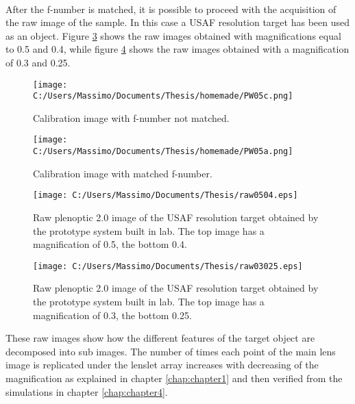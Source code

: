\\
After the f-number is matched, it is possible to proceed with the acquisition of the raw image of the sample. In this case a USAF resolution target has been used as an object. Figure \ref{fig:rawreal} shows the raw images obtained with magnifications equal to 0.5 and 0.4, while figure \ref{fig:rawreal2} shows the raw images obtained with a magnification of 0.3 and 0.25.
\begin{figure}[H]
	\centering
	\texttt{[image: C:/Users/Massimo/Documents/Thesis/homemade/PW05c.png]}
	\caption{\label{fig:calibrationimg1} Calibration image with f-number not matched. }
\end{figure}
\begin{figure}[H]
	\centering
	\texttt{[image: C:/Users/Massimo/Documents/Thesis/homemade/PW05a.png]}
	\caption{\label{fig:calibrationimg2} Calibration image with matched f-number. }
\end{figure}
\begin{figure}[H]
	\centering
	\texttt{[image: C:/Users/Massimo/Documents/Thesis/raw0504.eps]}
	\caption{\label{fig:rawreal} Raw plenoptic 2.0 image of the USAF resolution target obtained by the prototype system built in lab. The top image has a magnification of 0.5, the bottom 0.4. }
\end{figure}
\begin{figure}[H]
	\centering
	\texttt{[image: C:/Users/Massimo/Documents/Thesis/raw03025.eps]}
	\caption{\label{fig:rawreal2} Raw plenoptic 2.0 image of the USAF resolution target obtained by the prototype system built in lab. The top image has a magnification of 0.3, the bottom 0.25. }
\end{figure}
These raw images show how the different features of the target object are decomposed into sub images. The number of times each point of the main lens image is replicated under the lenslet array increases with decreasing of the magnification as explained in chapter \ref{chap:chapter1} and then verified from the simulations in chapter \ref{chap:chapter4}.
\newpage 
